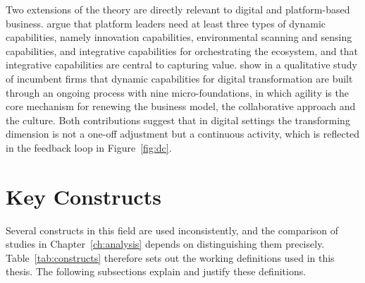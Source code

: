 Two extensions of the theory are directly relevant to digital and platform-based business. \textcite{helfat2018} argue that platform leaders need at least three types of dynamic capabilities, namely innovation capabilities, environmental scanning and sensing capabilities, and integrative capabilities for orchestrating the ecosystem, and that integrative capabilities are central to capturing value. \textcite{warner2019} show in a qualitative study of incumbent firms that dynamic capabilities for digital transformation are built through an ongoing process with nine micro-foundations, in which agility is the core mechanism for renewing the business model, the collaborative approach and the culture. Both contributions suggest that in digital settings the transforming dimension is not a one-off adjustment but a continuous activity, which is reflected in the feedback loop in Figure~\ref{fig:dc}.

\section{Key Constructs}
\label{sec:constructs}

Several constructs in this field are used inconsistently, and the comparison of studies in Chapter~\ref{ch:analysis} depends on distinguishing them precisely. Table~\ref{tab:constructs} therefore sets out the working definitions used in this thesis. The following subsections explain and justify these definitions.

